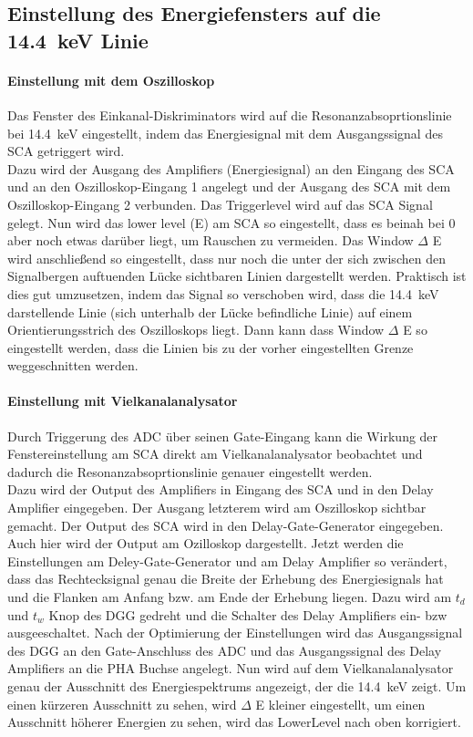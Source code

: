 \documentclass[a4paper,twoside,final]{article}
\begin{document}
\subsection{Einstellung des Energiefensters auf die \SI{14,4}{\kilo\electronvolt} Linie}
\paragraph{Einstellung mit dem Oszilloskop}
Das Fenster des Einkanal-Diskriminators wird auf die Resonanzabsoprtionslinie bei \SI{14,4}{\kilo\electronvolt} eingestellt, indem das Energiesignal mit dem Ausgangssignal des SCA getriggert wird. \\
Dazu wird der Ausgang des Amplifiers (Energiesignal) an den Eingang des SCA
und an den Oszilloskop-Eingang 1 angelegt und der Ausgang des SCA mit dem Oszilloskop-Eingang 2 verbunden. Das Triggerlevel wird auf das SCA Signal gelegt. Nun wird das lower level (E) am SCA so eingestellt, dass es beinah bei 0 aber noch etwas darüber liegt, um Rauschen zu vermeiden. Das Window $\Delta$ E wird anschließend so eingestellt, dass nur noch die unter der sich zwischen den Signalbergen auftuenden Lücke sichtbaren Linien dargestellt werden. Praktisch ist dies gut umzusetzen, indem das Signal so verschoben wird, dass die \SI{14,4}{\kilo\electronvolt} darstellende Linie (sich unterhalb der Lücke befindliche Linie) auf einem Orientierungsstrich des Oszilloskops liegt. Dann kann dass Window $\Delta$ E so eingestellt werden, dass die Linien bis zu der vorher eingestellten Grenze weggeschnitten werden.

\paragraph{Einstellung mit Vielkanalanalysator}
Durch Triggerung des  ADC über seinen Gate-Eingang kann die Wirkung der Fenstereinstellung am SCA direkt am Vielkanalanalysator beobachtet und dadurch die Resonanzabsoprtionslinie genauer eingestellt werden. \\
Dazu wird der Output des Amplifiers in Eingang des SCA und in den Delay Amplifier eingegeben. Der Ausgang letzterem wird am Oszilloskop sichtbar gemacht. Der Output des SCA wird in den Delay-Gate-Generator eingegeben.
Auch hier wird der Output am Ozilloskop dargestellt. Jetzt werden die Einstellungen am Deley-Gate-Generator und am Delay Amplifier so verändert, dass das Rechtecksignal genau die Breite der Erhebung des Energiesignals hat und die Flanken am Anfang bzw. am Ende der Erhebung liegen. Dazu wird am $t_d$ und $t_w$ Knop des DGG gedreht und die Schalter des Delay Amplifiers ein- bzw ausgeeschaltet. Nach der Optimierung der Einstellungen wird das Ausgangssignal des DGG an den Gate-Anschluss des ADC und das Ausgangssignal des Delay Amplifiers an die PHA Buchse angelegt. Nun wird auf dem Vielkanalanalysator genau der Ausschnitt des Energiespektrums angezeigt, der die \SI{14,4}{\kilo\electronvolt} zeigt. Um einen kürzeren Ausschnitt zu sehen, wird $\Delta$ E kleiner eingestellt, um einen Ausschnitt höherer Energien zu sehen, wird das LowerLevel nach oben korrigiert. \\
\end{document}
